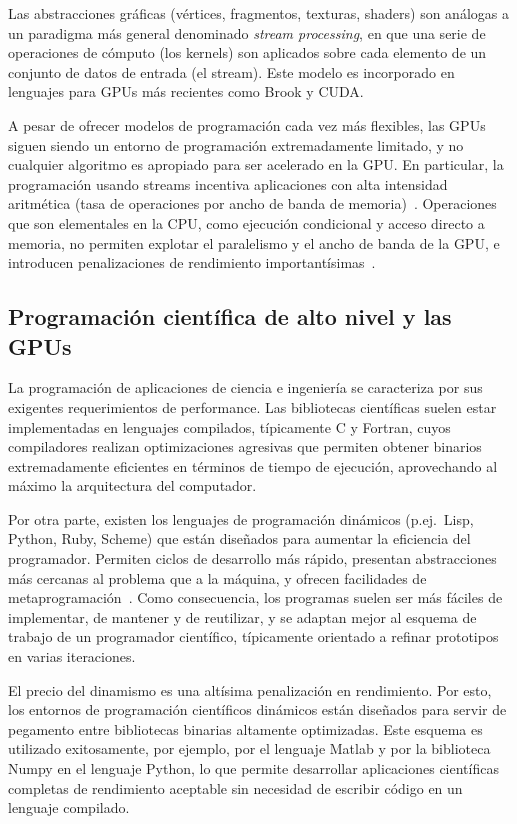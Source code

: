 \documentclass[11pt,spanish]{article}
\begin{document}
Las abstracciones gráficas (vértices, fragmentos, texturas, shaders)
son análogas a un paradigma más general denominado \emph{stream processing},
en que una serie de operaciones de cómputo (los kernels) son aplicados sobre
cada elemento de un conjunto de datos de entrada (el stream).  Este modelo es
incorporado en lenguajes para GPUs más recientes como Brook y CUDA.

A pesar de ofrecer modelos de programación cada vez más flexibles,
las GPUs siguen siendo un entorno de programación extremadamente limitado,
y no cualquier algoritmo es apropiado para ser acelerado en la GPU.
En particular, la programación usando streams
incentiva aplicaciones con alta intensidad aritmética
(tasa de operaciones por ancho de banda de memoria)~\cite[\S2.1]{brookgpu}.
Operaciones que son elementales en la CPU, como
ejecución condicional y acceso directo a memoria, no permiten explotar el
paralelismo y el ancho de banda de la GPU, e introducen penalizaciones de
rendimiento importantísimas~\cite[\S{}V.C]{gpu-computing}.

\subsection{Programación científica de alto nivel y las GPUs}
La programación de aplicaciones de ciencia e ingeniería se caracteriza por sus
exigentes requerimientos de performance.  Las bibliotecas científicas suelen
estar implementadas en lenguajes compilados, típicamente C y Fortran, cuyos
compiladores realizan optimizaciones agresivas que permiten obtener binarios
extremadamente eficientes en términos de tiempo de ejecución, aprovechando al
máximo la arquitectura del computador.

Por otra parte, existen los lenguajes de programación dinámicos (p.ej.~Lisp,
Python, Ruby, Scheme) que están diseñados para aumentar la eficiencia
del programador.  Permiten ciclos de desarrollo más rápido, presentan
abstracciones más cercanas al problema que a la máquina, y ofrecen
facilidades de metaprogramación~\cite[\S2]{pygpu}.  Como consecuencia, los
programas suelen ser más fáciles de implementar, de mantener y de reutilizar,
y se adaptan mejor al esquema de trabajo de un programador científico,
típicamente orientado a refinar prototipos en varias iteraciones.

El precio del dinamismo es una altísima penalización en rendimiento.  Por esto,
los entornos de programación científicos dinámicos están diseñados para servir
de pegamento entre bibliotecas binarias altamente optimizadas.  Este esquema es
utilizado exitosamente, por ejemplo, por el lenguaje Matlab y por la biblioteca
Numpy en el lenguaje Python, lo que permite desarrollar aplicaciones científicas
completas de rendimiento aceptable sin necesidad de escribir código en un
lenguaje compilado.
\end{document}
